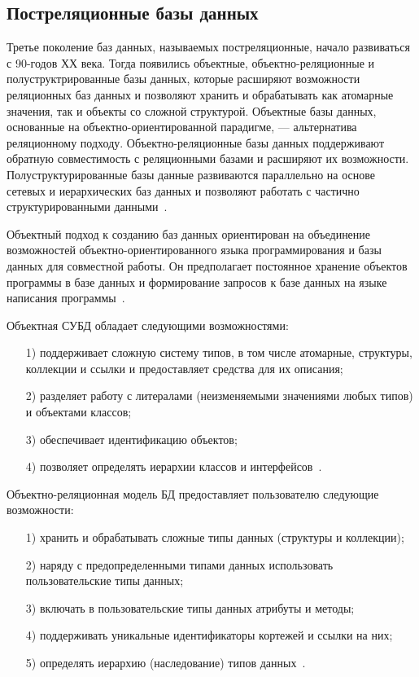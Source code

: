 \documentclass{bmstu}
\begin{document}
\subsection{Постреляционные базы данных}

Третье поколение баз данных, называемых постреляционные, начало развиваться с 90-годов ХХ века. 
Тогда появились объектные, объектно-реляционные и полуструктрированные базы данных, которые расширяют возможности реляционных баз данных и позволяют хранить и обрабатывать как атомарные значения, так и объекты со сложной структурой. 
Объектные базы данных, основанные на объектно-ориентированной парадигме, --- альтернатива реляционному подходу. 
Объектно-реляционные базы данных поддерживают обратную совместимость с реляционными базами и расширяют их
возможности. 
Полуструктурированные базы данные развиваются параллельно на основе сетевых и иерархических баз данных и позволяют работать с частично структурированными данными~\cite{Vinogradov2016}.

Объектный подход к созданию баз данных ориентирован на объединение возможностей объектно-ориентированного языка программирования и базы данных для совместной работы. 
Он предполагает постоянное хранение объектов программы в базе данных и формирование запросов к базе данных на языке написания программы~\cite{Vinogradov2016}.

Объектная СУБД обладает следующими возможностями:
\begin{enumerate}
\item[1)] поддерживает сложную систему типов, в том числе атомарные, структуры, коллекции и ссылки и предоставляет средства для их описания;
\item[2)] разделяет работу с литералами (неизменяемыми значениями любых типов) и объектами классов;
\item[3)] обеспечивает идентификацию объектов;
\item[4)] позволяет определять иерархии классов и интерфейсов~\cite{Vinogradov2016}.
\end{enumerate}

Объектно-реляционная модель БД предоставляет пользователю следующие возможности:
\begin{enumerate}
\item[1)] хранить и обрабатывать сложные типы данных (структуры и коллекции);
\item[2)] наряду с предопределенными типами данных использовать пользовательские типы данных;
\item[3)] включать в пользовательские типы данных атрибуты и методы;
\item[4)] поддерживать уникальные идентификаторы кортежей и ссылки на них;
\item[5)] определять иерархию (наследование) типов данных~\cite{Vinogradov2016}.
\end{enumerate}
\end{document}
